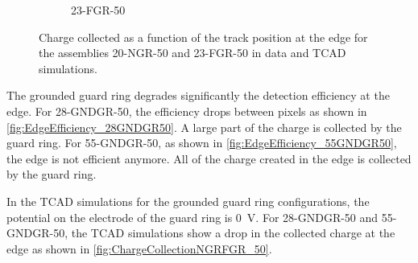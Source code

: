 \begin{figure}[htbp]
\begin{subfigure}[b]{0.45\textwidth}
    \caption{23-FGR-50}\label{fig:ChargeCollection23FGR}
  \end{subfigure}
  \caption{Charge collected as a function of the track position at the
    edge for the assemblies 20-NGR-50 and 23-FGR-50 in data and TCAD
    simulations.}
  \label{fig:ChargeCollectionNGRFGR}
\end{figure}



The grounded guard ring degrades significantly the detection
efficiency at the edge. For 28-GNDGR-50, the efficiency drops between
pixels as shown in \cref{fig:EdgeEfficiency_28GNDGR50}. A large part
of the charge is collected by the guard ring. For 55-GNDGR-50, as
shown in \cref{fig:EdgeEfficiency_55GNDGR50}, the edge is not
efficient anymore. All of the charge created in the edge is collected
by the guard ring.

In the TCAD simulations for the grounded guard ring configurations,
the potential on the electrode of the guard ring is 0~V. For
28-GNDGR-50 and 55-GNDGR-50, the TCAD simulations show a drop in the
collected charge at the edge as shown in
\cref{fig:ChargeCollectionNGRFGR_50}.

